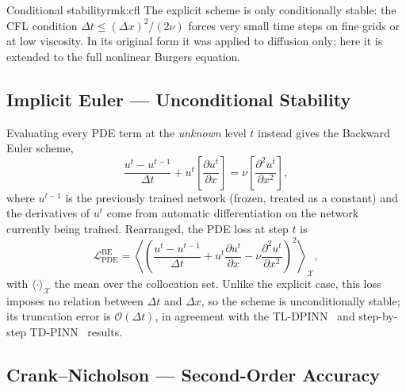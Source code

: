 \begin{Rmk}{Conditional stability}{rmk:cfl}
  The explicit scheme is only conditionally stable: the CFL condition
  $\Delta t \leq (\Delta x)^2/(2\nu)$ forces very small time steps on fine
  grids or at low viscosity. In its original form it was applied to diffusion
  only; here it is extended to the full nonlinear Burgers equation.
\end{Rmk}

\subsection{Implicit Euler --- Unconditional Stability}

Evaluating every PDE term at the \emph{unknown} level $t$ instead gives the
Backward Euler scheme,
\[
  \frac{u^{t} - u^{t-1}}{\Delta t}
  + u^{t}\left[\frac{\partial u^{t}}{\partial x}\right]
  = \nu\left[\frac{\partial^2 u^{t}}{\partial x^2}\right],
\]
where $u^{t-1}$ is the previously trained network (frozen, treated as a
constant) and the derivatives of $u^t$ come from automatic differentiation on
the network currently being trained. Rearranged, the PDE loss at step $t$ is
\begin{equation}
  \mathcal{L}_\text{PDE}^{\text{BE}}
  = \left\langle\left(
      \frac{u^{t} - u^{t-1}}{\Delta t}
      + u^{t}\frac{\partial u^{t}}{\partial x}
      - \nu\frac{\partial^2 u^{t}}{\partial x^2}
    \right)^{\!2}\right\rangle_{\!\mathcal{X}},
  \label{eq:loss_be}
\end{equation}
with $\langle\cdot\rangle_{\mathcal{X}}$ the mean over the collocation set.
Unlike the explicit case, this loss imposes no relation between $\Delta t$ and
$\Delta x$, so the scheme is unconditionally stable; its truncation error is
$\mathcal{O}(\Delta t)$, in agreement with the TL-DPINN~\cite{Chen2023} and
step-by-step TD-PINN~\cite{Bravo2024} results.

\subsection{Crank--Nicholson --- Second-Order Accuracy}

